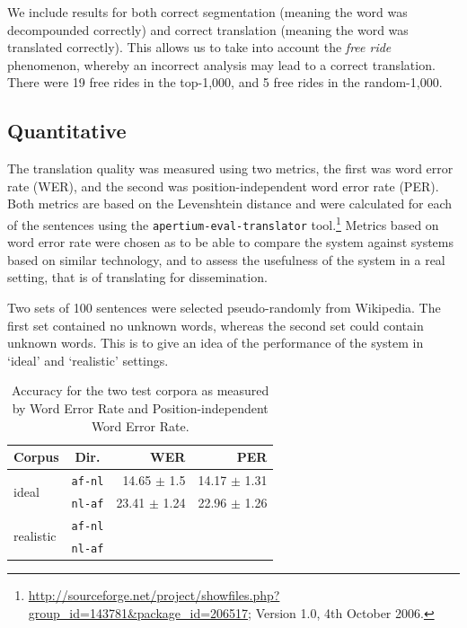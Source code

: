 \documentclass[11pt]{article}
\begin{document}
We include results for both correct segmentation (meaning the word was decompounded 
correctly) and correct translation (meaning the word was translated correctly). This allows
us to take into account the {\em free ride} phenomenon, whereby an incorrect analysis
may lead to a correct translation. There were 19 free rides in the top-1,000, and 5 free 
rides in the random-1,000.

\subsection{Quantitative}

The translation quality was measured using two metrics, the first was word error rate (WER), and the 
second was position-independent word error rate (PER). Both metrics are based on the Levenshtein 
distance \cite{Levenshtein:65} and were calculated for each of the sentences using the 
{\small \texttt{apertium-eval-translator}} tool.\footnote{\url{http://sourceforge.net/project/showfiles.php?group_id=143781&package_id=206517}; Version 1.0, 4th October 2006.} Metrics based on word error rate were chosen as to be able to compare 
the system against systems based on similar technology, and to assess the usefulness of the 
system in a real setting, that is of translating for dissemination. 

Two sets of 100 sentences were selected pseudo-randomly from Wikipedia. The first set contained 
no unknown words, whereas the second set could contain unknown words. This is to give an idea
of the performance of the system in `ideal' and `realistic' settings.

\begin{table}
  \begin{center}
  \begin{tabular}{|l|c|r|r|}
   \hline
   {\bf Corpus}                & {\bf Dir.}  & {\bf WER}    & {\bf PER}\\
   \hline
   \multirow{2}{*}{ideal}      &  {\small {\tt af-nl}}      & 14.65 $\pm$ 1.5        &  14.17 $\pm$ 1.31 \\ 
                               &  {\small {\tt nl-af}}      & 23.41 $\pm$ 1.24     & 22.96 $\pm$ 1.26 \\
   \hline
   \multirow{2}{*}{realistic}  &  {\small {\tt af-nl}}      &              &  ~ \\ 
                               &  {\small {\tt nl-af}}      &              & ~ \\
   \hline
  \end{tabular}
    \caption{Accuracy for the two test corpora as measured by Word Error Rate 
        and Position-independent Word Error Rate.}
    \label{table:quan}
  \end{center}
\end{table}
\end{document}
